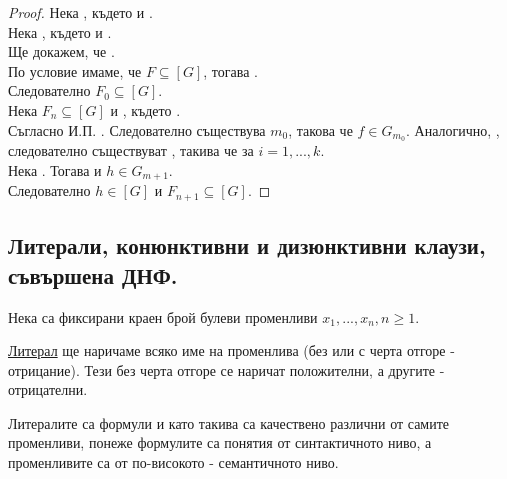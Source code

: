 \begin{proof}
    Нека , където  и 
    . \\
    Нека , където  и 
    . \\
    Ще докажем, че . \\
    По условие имаме, че \(F \subseteq [G]\), тогава . \\
    Следователно \(F_0 \subseteq [G]\). \\
    Нека \(F_n \subseteq [G]\) и , 
    където . \\
    Съгласно И.П. . Следователно съществува \(m_0\), такова 
    че \(f \in G_{m_0}\). Аналогично, , следователно съществуват 
    , такива че  за \(i = 1, ..., k\). \\
    Нека . Тогава  и \(h \in G_{m + 1}\). \\
    Следователно \(h \in [G]\) и \(F_{n + 1} \subseteq [G]\).
\end{proof}

\subsection{Литерали, конюнктивни и дизюнктивни клаузи, съвършена ДНФ.}
Нека са фиксирани краен брой булеви променливи \(x_1, ..., x_n, n \ge 1\).

\begin{definition}
    \underline{Литерал} ще наричаме всяко име на променлива (без или с черта отгоре - отрицание). Тези 
    без черта отгоре се наричат положителни, а другите - отрицателни. 
\end{definition}

Литералите са формули и като такива са качествено различни от самите променливи, понеже формулите са 
понятия от синтактичното ниво, а променливите са от по-високото - семантичното ниво.

